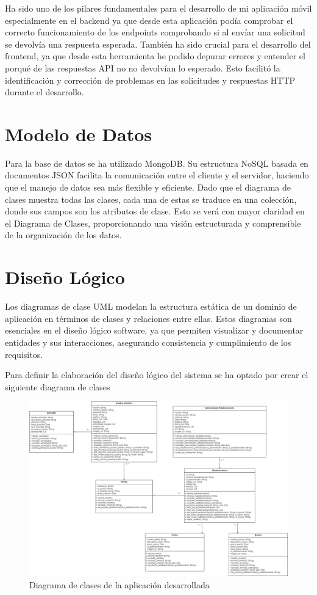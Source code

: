 Ha sido uno de los pilares fundamentales para el desarrollo de mi aplicación móvil especialmente en el backend ya que desde esta aplicación podía comprobar el correcto funcionamiento de los endpoints comprobando si al envíar una solicitud se devolvía una respuesta esperada. También ha sido crucial para el desarrollo del frontend, ya que desde esta herramienta he podido depurar errores y entender el porqué de las respuestas API no no devolvían lo esperado. Esto facilitó la identificación y corrección de problemas en las solicitudes y respuestas HTTP durante el desarrollo.

\section{Modelo de Datos}

Para la base de datos se ha utilizado MongoDB. Su estructura NoSQL basada en documentos JSON facilita la comunicación entre el cliente y el servidor, haciendo que el manejo de datos sea más flexible y eficiente. Dado que el diagrama de clases muestra todas las clases, cada una de estas se traduce en una colección, donde sus campos son los atributos de clase. Esto se verá con mayor claridad en el Diagrama de Clases, proporcionando una visión estructurada y comprensible de la organización de los datos.

\section{Diseño Lógico}

Los diagramas de clase UML modelan la estructura estática de un dominio de aplicación en términos de clases y relaciones entre ellas. Estos diagramas son esenciales en el diseño lógico software, ya que permiten visualizar y documentar entidades y sus interacciones, asegurando consistencia y cumplimiento de los requisitos. \cite{berardi}

Para definir la elaboración del diseño lógico del sistema se ha optado por crear el siguiente diagrama de clases

\begin{figure}[H]
    \centering
    \includegraphics[width=\textwidth]{imagenes/DiagramaHangOut.jpg}
    \caption{Diagrama de clases de la aplicación desarrollada}
    \label{fig:DiagramaHangOut}
\end{figure}


